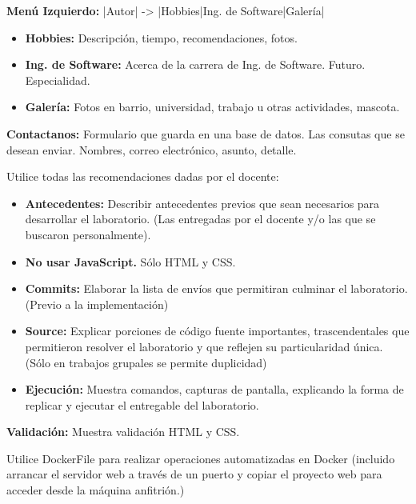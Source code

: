 \textbf{Menú Izquierdo:} |Autor| -> |Hobbies|Ing. de Software|Galería|

\begin{itemize}
    \item \textbf{Hobbies:} Descripción, tiempo, recomendaciones, fotos.
    
    \item \textbf{Ing. de Software:} Acerca de la carrera de Ing. de Software. Futuro. Especialidad.
    
    \item \textbf{Galería:} Fotos en barrio, universidad, trabajo u otras actividades, mascota.
\end{itemize}

\textbf{Contactanos:} Formulario que guarda en una base de datos. Las consutas que se desean enviar. Nombres, correo electrónico, asunto, detalle.

Utilice todas las recomendaciones dadas por el docente:

\begin{itemize}
    \item \textbf{Antecedentes:} Describir antecedentes previos que sean necesarios para desarrollar el laboratorio. (Las entregadas por el docente y/o las que se buscaron personalmente).
    
    \item \textbf{No usar JavaScript.} Sólo HTML y CSS.
    
    \item \textbf{Commits:} Elaborar la lista de envíos que permitiran culminar el laboratorio. (Previo a la implementación)
    
    \item \textbf{Source:} Explicar porciones de código fuente importantes, trascendentales que permitieron resolver el laboratorio y que reflejen su particularidad única. (Sólo en trabajos grupales se permite duplicidad)
    
    \item \textbf{Ejecución:} Muestra comandos, capturas de pantalla, explicando la forma de replicar y ejecutar el entregable del laboratorio.
\end{itemize}

\textbf{Validación:} Muestra validación HTML y CSS.

Utilice DockerFile para realizar operaciones automatizadas en Docker (incluido arrancar el servidor web a través de un puerto y copiar el proyecto web para acceder desde la máquina anfitrión.)

